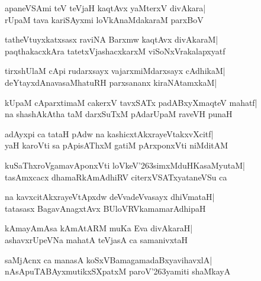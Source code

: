 \documentclass[twoside,12pt,openright]{book}
\def\S{\char'263}
\newcounter{shloka}[chapter]
\begin{document}
\begin{shloka}%
apaneVSAmi teV teVjaH kaqtAvx yaMterxV divAkara|\\
rUpaM tava kariSAyxmi loVkAnaMdakaraM parxBoV
\end{shloka}

\begin{shloka}%
tatheVtuyxkatxsasx raviNA Barxmw kaqtAvx divAkaraM|\\
paqthakacxkAra tatetxVjashacxkarxM viSoNxVrakalapxyatf
\end{shloka}

\begin{shloka}%
tirxshUlaM cApi rudarxsayx vajarxmiMdarxsayx cAdhikaM|\\
deYtayxdAnavasaMhatuRH parxsananx kiraNAtamxkaM|
\end{shloka}

\begin{shloka}%
kUpaM cAparxtimaM cakerxV tavxSATx padABxyXmaqteV mahatf|\\
na shashAkAtha taM darxSuTxM pAdarUpaM raveVH punaH
\end{shloka}

\begin{shloka}%
adAyxpi ca tataH pAdw na kashicxtAkxrayeVtakxvXcitf|\\
yaH karoVti sa pApisAThxM gatiM pArxponxVti niMditAM
\end{shloka}

\begin{shloka}%
kuSaThxroVgamavAponxVti loVkeV\S simxMduHKasaMyutaM|\\
tasAmxcacx dhamaRkAmAdhiRV citerxVSATxyataneVSu ca
\end{shloka}

\begin{shloka}%
na kavxcitAkxrayeVtApxdw deVvadeVvasayx dhiVmataH|\\
tatasasx BagavAnagxtAvx BUloVRVkamamarAdhipaH
\end{shloka}

\begin{shloka}%
kAmayAmAsa kAmAtARM muKa Eva divAkaraH|\\
ashavxrUpeVNa mahatA teVjasA ca samanivxtaH
\end{shloka}

\begin{shloka}%
saMjAcnx ca manasA koSxVBamagamadaBxyavihavxlA|\\
nAsApuTABAyxmutikxSXpatxM paroV\S yamiti shaMkayA
\end{shloka}
\end{document}
